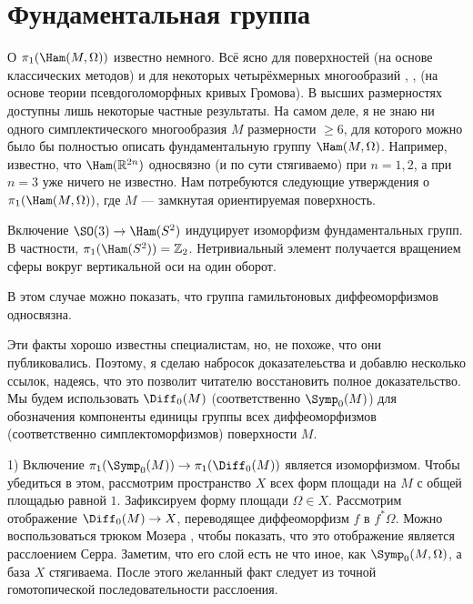 \section{Фундаментальная группа}
О $\pi_1 (\Ham (M, \Omega))$ известно немного.
Всё ясно для поверхностей (на основе классических методов) и для некоторых четырёхмерных многообразий \cite{G1}, \cite{A}, \cite{AM} (на основе теории псевдоголоморфных кривых Громова).
В высших размерностях доступны лишь некоторые частные результаты.
На самом деле, я не знаю ни одного симплектического многообразия $M$ размерности $\ge 6$, для которого можно было бы полностью описать фундаментальную группу $\Ham (M, \Omega)$.
Например, известно, что $\Ham (\RR^{2n})$ односвязно (и по сути стягиваемо) при $n = 1, 2$, а при $n = 3$ уже ничего не известно.
Нам потребуются следующие утверждения о $\pi_1 (\Ham (M, \Omega))$, где $M$ --- замкнутая ориентируемая поверхность.

\begin{thm}{}\label{7.2.A}
Включение $\SO (3) \to \Ham (S^2)$ индуцирует изоморфизм фундаментальных групп.
В частности, $\pi_1 (\Ham (S^2))=\ZZ_2$.
Нетривиальный элемент получается вращением сферы вокруг вертикальной оси на один оборот.
\end{thm}

\begin{thm}{}
\label{7.2.B}
В этом случае можно показать, что группа гамильтоновых диффеоморфизмов односвязна.
\end{thm}

Эти факты хорошо известны специалистам, но, не похоже, что они публиковались.
Поэтому, я сделаю набросок доказателеьства и добавлю несколько ссылок,
надеясь, что это позволит читателю восстановить полное доказательство.
Мы будем использовать $\Diff_0 (M)$ (соответственно $\Symp_0 (M)$) для обозначения компоненты единицы группы всех диффеоморфизмов (соответственно симплектоморфизмов) поверхности $M$.


1) Включение $\pi_1 (\Symp_0 (M)) \to \pi_1 (\Diff_0 (M))$ является изоморфизмом.
Чтобы убедиться в этом, рассмотрим пространство $X$ всех форм площади на $M$ с общей площадью равной $1$.
Зафиксируем форму площади $\Omega \in X$.
Рассмотрим отображение $\Diff_0 (M) \to X$, переводящее диффеоморфизм $f$ в $f^\ast \Omega$.
Можно воспользоваться трюком Мозера \cite[p. 94--95]{MS}, чтобы показать, что это отображение является расслоением Серра.
Заметим, что его слой есть не что иное, как $\Symp_0 (M, \Omega)$, а база $X$ стягиваема.
После этого желанный факт следует из точной гомотопической последовательности расслоения.

